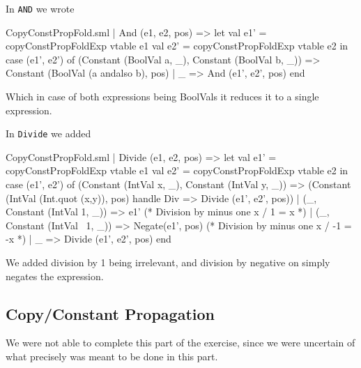 \documentclass[11pt,a4paper,oneside]{report}
\begin{document}
In \texttt{AND} we wrote
\begin{code}[firstnumber=59]{CopyConstPropFold.sml}
      | And (e1, e2, pos) =>
        let val e1' = copyConstPropFoldExp vtable e1
            val e2' = copyConstPropFoldExp vtable e2
        in case (e1', e2') of
               (Constant (BoolVal a, _), Constant (BoolVal b, _)) =>
               Constant (BoolVal (a andalso b), pos)
             | _ => And (e1', e2', pos)
        end
\end{code}
Which in case of both expressions being BoolVals it reduces it to a single expression.

\newpage
In \texttt{Divide} we added
\begin{code}[firstnumber=139]{CopyConstPropFold.sml}
      | Divide (e1, e2, pos) =>
        let val e1' = copyConstPropFoldExp vtable e1
            val e2' = copyConstPropFoldExp vtable e2
        in case (e1', e2') of
               (Constant (IntVal x, _), Constant (IntVal y, _)) =>
                 (Constant (IntVal (Int.quot (x,y)), pos)
                   handle Div => Divide (e1', e2', pos))
              | (_, Constant (IntVal 1, _)) =>
                e1' (* Division by minus one x / 1 = x *)
              | (_, Constant (IntVal ~1, _)) =>
                Negate(e1', pos) (* Division by minus one x / -1 = -x *)
              | _ => Divide (e1', e2', pos)
        end
\end{code}
We added division by 1 being irrelevant, and division by negative on simply negates the expression.


\subsection*{Copy/Constant Propagation}

We were not able to complete this part of the exercise, since we were uncertain of what precisely was meant to be done in this part.
\end{document}
